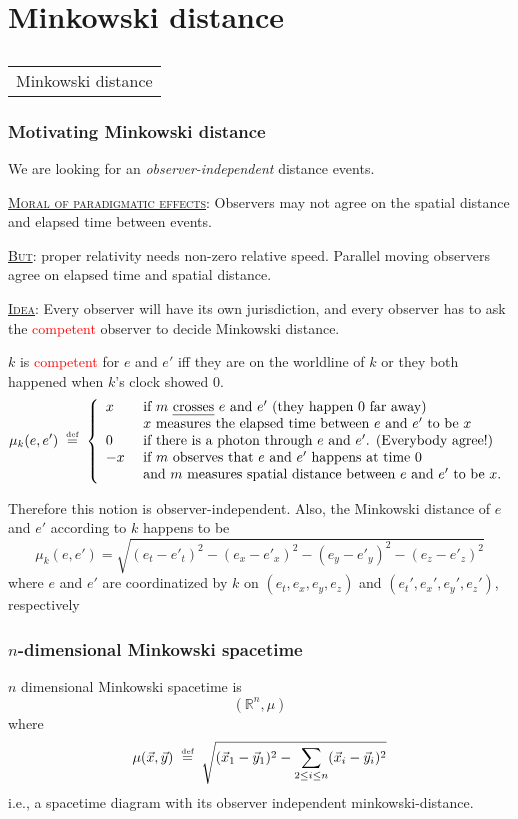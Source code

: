 \documentclass[xcolor=x11names]{beamer}
\makeatletter
\let\beamer@writeslidentry@miniframeson=\beamer@writeslidentry
\def\beamer@writeslidentry@miniframesoff{%
  \expandafter\beamer@ifempty\expandafter{\beamer@framestartpage}{}%
  {%
    \clearpage\beamer@notesactions%
  }
}
\newcommand*{\miniframeson}{\let\beamer@writeslidentry=\beamer@writeslidentry@miniframeson}
\newcommand*{\miniframesoff}{\let\beamer@writeslidentry=\beamer@writeslidentry@miniframesoff}
\newcommand{\cimdia}[1] {\miniframesoff \begin{frame}\begin{center}\huge \begin{tabular}{c}#1\end{tabular}\end{center}\end{frame}\miniframeson}
\newcommand{\szakasz}[2][]{\section{#1}\subsection{}\cimdia{#2}}
\newcommand{\dzsa}[1]{\textsc{\underline{#1}}:}
\newcommand{\cemph}[1]{\textcolor{red}{#1}}
\newcommand{\defegy}[1][.1]{\hspace{#1cm}\overset{\textup{\tiny def}}{=}\hspace{#1cm}}
\makeatother
\begin{document}
\szakasz[Minkowski distance]{Minkowski distance}
\begin{frame}[t]
\frametitle{Motivating Minkowski distance}
We are looking for an \emph{observer-independent} distance events.

\dzsa{Moral of paradigmatic effects} Observers may not agree on the spatial distance and elapsed time between events.

\dzsa{But} proper relativity needs non-zero relative speed. Parallel moving observers agree on elapsed time and spatial distance.

\dzsa{Idea} Every observer will have its own jurisdiction, and every observer has to ask the \cemph{competent} observer to decide Minkowski distance.

$k$ is \cemph{competent} for $e$ and $e'$ iff they are on the worldline of $k$ or they both happened when $k$'s clock showed $0$.
\[
\mu_k (e,e')\defegy
\left\{
\begin{array}{ll}
   x  & \textup{ if $m$ \emph{crosses} $e$ and $e'$ (they happen $0$ far away)} 
        \\ & \textup{ $x$ measures the elapsed time between $e$ and $e'$ to be $x$}
\\ 0  & \textup{ if there is a photon through $e$ and $e'$. (Everybody agree!)}
\\ -x & \textup{ if $m$ observes that $e$ and $e'$ happens at time 0}
        \\ & \textup{ and $m$ measures spatial distance between $e$ and $e'$ to be $x$.}
\end{array}
\right.
\]

Therefore this notion is observer-independent. Also, the Minkowski distance of $e$ and $e'$ according to $k$ happens to be
\[ \mu_k (e,e') = \sqrt{(e_t-e'_t)^2- (e_x-e'_x)^2- (e_y-e'_y)^2- (e_z-e'_z)^2} \]
where $e$ and $e'$ are coordinatized by $k$ on $(e_t, e_x, e_y, e_z)$ and $(e_t', e_x', e_y', e_z')$, respectively

\end{frame}

\begin{frame}[t]
\frametitle{$n$-dimensional Minkowski spacetime}
$n$ dimensional Minkowski spacetime is 
\[(\mathbb R^n, \mu)\]
where 
\[\mu(\vec x , \vec y) \defegy \sqrt{(\vec x_1 - \vec y_1)^2-\sum_{2\leq i\leq n} (\vec x_i - \vec y_i)^2 }\]
i.e., a spacetime diagram with its observer independent minkowski-distance.

\end{frame}
\end{document}
